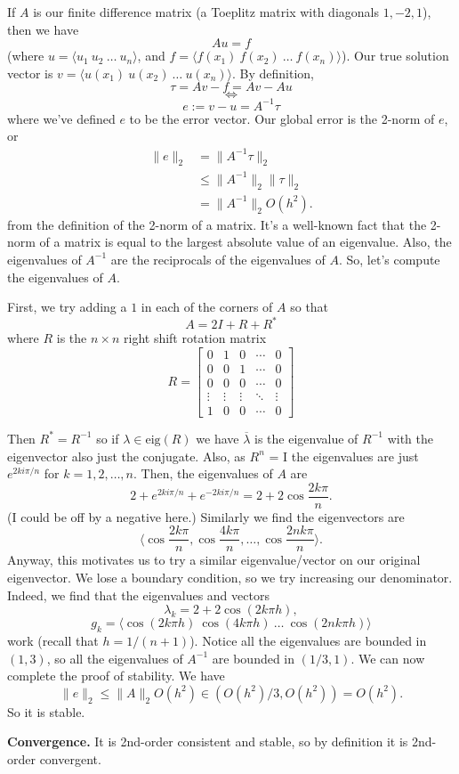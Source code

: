 \documentclass[12pt,oneside]{article}
\begin{document}
	If $A$ is our finite difference matrix (a Toeplitz matrix with diagonals $1, -2, 1$), then we have
	$$Au = f$$
	(where $u = \langle u_1\ u_2\ \dots\ u_n\rangle$, and $f = \langle f(x_1)\ f(x_2)\ \dots\ f(x_n)\rangle$). Our true solution vector is $v = \langle u(x_1)\ u(x_2)\ \dots\ u(x_n)\rangle$. By definition,
	$$\tau = Av - f = Av - Au$$
	$$\Longleftrightarrow$$
	$$e := v-u = A^{-1}\tau$$
	where we've defined $e$ to be the error vector. Our global error is the 2-norm of $e$, or
	\begin{align*}
	\lVert e\rVert_2 &= \lVert A^{-1}\tau\rVert_2\\
	&\le \lVert A^{-1}\rVert_2 \lVert \tau\rVert_2\\
	&= \lVert A^{-1}\rVert_2 O(h^2).
	\end{align*}
	from the definition of the 2-norm of a matrix. It's a well-known fact that the 2-norm of a matrix is equal to the largest absolute value of an eigenvalue. Also, the eigenvalues of $A^{-1}$ are the reciprocals of the eigenvalues of $A$. So, let's compute the eigenvalues of $A$.
	
	First, we try adding a $1$ in each of the corners of $A$ so that
	$$A = 2I + R + R^*$$
	where $R$ is the $n\times n$ right shift rotation matrix
	$$R = \begin{bmatrix}0&1&0&\cdots&0\\0&0&1&\cdots&0\\0&0&0&\cdots&0\\\vdots&\vdots&\vdots&\ddots&\vdots\\1&0&0&\cdots&0\end{bmatrix}$$
	
	Then $R^* = R^{-1}$  so if $\lambda\in \text{eig}(R)$ we have $\overline{\lambda}$ is the eigenvalue of $R^{-1}$ with the eigenvector also just the conjugate. Also, as $R^n$ = I the eigenvalues are just $e^{2ki\pi/n}$ for $k=1, 2, \dots, n$. Then, the eigenvalues of $A$ are
	$$2 + e^{2ki\pi/n}+e^{-2ki\pi/n} = 2 + 2\cos\frac{2k\pi}{n}.$$
	(I could be off by a negative here.) Similarly we find the eigenvectors are
	$$\langle \cos\frac{2k\pi}{n}, \cos\frac{4k\pi}{n}, \dots, \cos\frac{2nk\pi}{n}\rangle.$$
	Anyway, this motivates us to try a similar eigenvalue/vector on our original eigenvector. We lose a boundary condition, so we try increasing our denominator. Indeed, we find that the eigenvalues and vectors
	$$\lambda_k = 2 + 2\cos(2k\pi h),$$
	$$g_k = \langle \cos(2k\pi h)\ \cos(4k\pi h)\ \dots\ \cos(2nk\pi h) \rangle$$
	work (recall that $h = 1/(n+1)$). Notice all the eigenvalues are bounded in $(1, 3)$, so all the eigenvalues of $A^{-1}$ are bounded in $(1/3, 1)$. We can now complete the proof of stability. We have
	$$\lVert e\rVert_2\le \lVert A\rVert_2 O(h^2) \in (O(h^2)/3, O(h^2)) = O(h^2).$$
	So it is stable.
	
	\textbf{Convergence.} It is 2nd-order consistent and stable, so by definition it is 2nd-order convergent.
	
	
\end{document}
